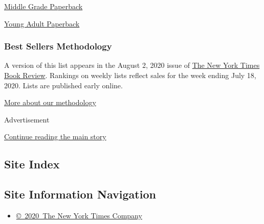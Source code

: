 \href{/books/best-sellers/2020/08/02/middle-grade-paperback-monthly/}{Middle
Grade Paperback}

\href{/books/best-sellers/2020/08/02/young-adult-paperback-monthly/}{Young
Adult Paperback}

\hypertarget{best-sellers-methodology-1}{%
\subsubsection{Best Sellers
Methodology}\label{best-sellers-methodology-1}}

A version of this list appears in the August 2, 2020 issue of
\href{http://www.nytimes3xbfgragh.onion/section/books/review}{The New
York Times Book Review}. Rankings on weekly lists reflect sales for the
week ending July 18, 2020. Lists are published early online.

\href{/books/best-sellers/methodology/}{More about our methodology}

Advertisement

\protect\hyperlink{after-bottom}{Continue reading the main story}

\hypertarget{site-index}{%
\subsection{Site Index}\label{site-index}}

\hypertarget{site-information-navigation}{%
\subsection{Site Information
Navigation}\label{site-information-navigation}}

\begin{itemize}
\tightlist
\item
  \href{https://help.nytimes3xbfgragh.onion/hc/en-us/articles/115014792127-Copyright-notice}{©~2020~The
  New York Times Company}
\end{itemize}

